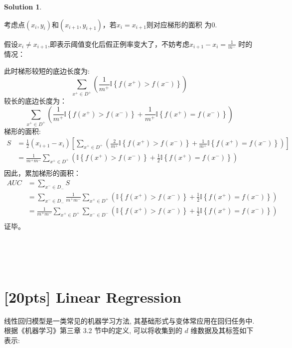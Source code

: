 \documentclass[a4paper,UTF8]{article}
\numberwithin{equation}{section}
\theoremstyle{definition}
\newtheorem*{solution}{Solution}
\begin{document}
\begin{solution}
\begin{enumerate}
考虑点$(x_i, y_i)$和$(x_{i+1}, y_{i+1})$，若$x_i=x_{i+1}$则对应梯形的面积
为0.

假设$x_i\neq x_{i+1}$,即表示阈值变化后假正例率变大了，不妨考虑$x_{i+1}-x_i=\frac{1}{m^{-}}$
时的情况：

此时梯形较短的底边长度为:
\begin{equation}
	\sum\limits_{x^{+}\in D^{+}}(\frac{1}{m^{+}}\mathbb{I}\left\{f(x^{+})>f(x^{-})\right\})
\end{equation}
较长的底边长度为：
\begin{equation}
	\sum\limits_{x^{+}\in D^{+}}(\frac{1}{m^{+}}\mathbb{I}\left\{f(x^{+})>f(x^{-})\right\}+\frac{1}{m^{+}}\mathbb{I}\left\{f(x^{+})=f(x^{-})\right\})
\end{equation}
梯形的面积:
\begin{equation}
	\begin{aligned}
		S &= \frac{1}{2}(x_{i+1}-x_{i})\left[\sum\limits_{x^{+}\in D^{+}}(\frac{2}{m^{+}}\mathbb{I}\left\{f(x^{+})>f(x^{-})\right\}+\frac{1}{m^{+}}\mathbb{I}\left\{f(x^{+})=f(x^{-})\right\})\right] \\
		  &= \frac{1}{m^{+}m^{-}}\sum\limits_{x^{+}\in D^{+}}(\mathbb{I}\left\{f(x^{+})>f(x^{-})\right\}+\frac{1}{2}\mathbb{I}\left\{f(x^{+})=f(x^{-})\right\}) \\
	\end{aligned}
\end{equation}
因此，累加梯形的面积：
\begin{equation}
	\begin{aligned}
		AUC &= \sum\limits_{x^{-}\in D_{-}}S\\
		    &= \sum\limits_{x^{-}\in D_{-}}\frac{1}{m^{+}m^{-}}\sum\limits_{x^{+}\in D^{+}}(\mathbb{I}\left\{f(x^{+})>f(x^{-})\right\}+\frac{1}{2}\mathbb{I}\left\{f(x^{+})=f(x^{-})\right\})\\
			&= \frac{1}{m^{+}m^{-}}\sum\limits_{x^{+}\in D^{+}}\sum\limits_{x^{-}\in D^{-}}(\mathbb{I}\left\{f(x^{+})>f(x^{-})\right\}+\frac{1}{2}\mathbb{I}\left\{f(x^{+})=f(x^{-})\right\})\\
		\end{aligned}
\end{equation}
证毕。
\end{enumerate}
		~\\
		~\\
		~\\
	\end{solution}
	\newpage
	
	
	
	
	\section{[20pts] Linear Regression}
	线性回归模型是一类常见的机器学习方法, 其基础形式与变体常应用在回归任务中. 根据《机器学习》第三章 3.2 节中的定义, 可以将收集到的 $d$ 维数据及其标签如下表示: 
	
\end{document}
